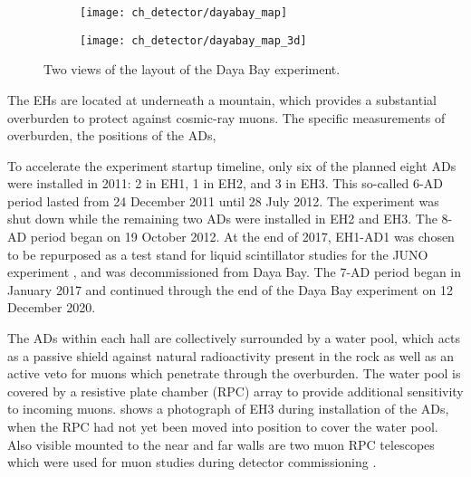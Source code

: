 \begin{figure}
    \centering
    \begin{subfigure}{0.49\textwidth}
        \texttt{[image: ch\_detector/dayabay\_map]}
    \end{subfigure}
    \begin{subfigure}{0.49\textwidth}
        \texttt{[image: ch\_detector/dayabay\_map\_3d]}
    \end{subfigure}
    \caption{Two views of the layout of the Daya Bay experiment.}
    \label{fig:layout}
\end{figure}

The EHs are located at underneath a mountain, which provides a substantial
overburden to protect against cosmic-ray muons.
The specific measurements of overburden, the positions of the ADs,


To accelerate the experiment startup timeline,
only six of the planned eight ADs were installed in 2011:
2 in EH1, 1 in EH2, and 3 in EH3.
This so-called 6-AD period lasted from 24 December 2011 until 28 July 2012. %
The experiment was shut down while the remaining two ADs were installed
in EH2 and EH3.
The 8-AD period began on 19 October 2012.
At the end of 2017, EH1-AD1 was chosen to be repurposed as a test stand
for liquid scintillator studies for the JUNO experiment \cite{junoproposal2016},
and was decommissioned from Daya Bay.
The 7-AD period began in January 2017 and continued through the end of
the Daya Bay experiment on 12 December 2020.

The ADs within each hall are collectively surrounded by a water pool,
which acts as a passive shield against natural radioactivity present in the rock
as well as an active veto for muons which penetrate through the overburden.
The water pool is covered by a resistive plate chamber (RPC) array
to provide additional sensitivity to incoming muons.
 shows a photograph of EH3 during installation of the ADs,
when the RPC had not yet been moved into position to cover the water pool.
Also visible mounted to the near and far walls are two muon RPC telescopes
which were used for muon studies during detector commissioning \cite{muonsystem2015}.

